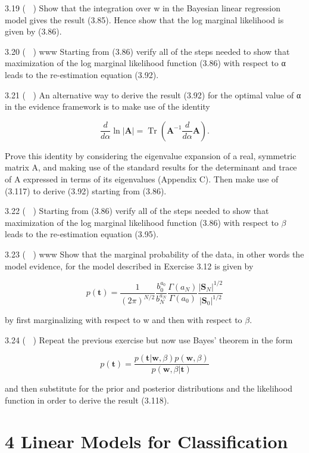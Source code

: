 \documentclass[
  10
]{article}
\begin{document}
3.19 ( ) Show that the integration over w in the Bayesian linear
regression model gives the result (3.85). Hence show that the log
marginal likelihood is given by (3.86).

3.20 ( ) www Starting from (3.86) verify all of the steps needed to show
that maximization of the log marginal likelihood function (3.86) with
respect to α leads to the re-estimation equation (3.92).

3.21 ( ) An alternative way to derive the result (3.92) for the optimal
value of α in the evidence framework is to make use of the identity

\[
\frac {d}{d \alpha} \ln | \mathbf {A} | = \operatorname{Tr} \left(\mathbf {A} ^ {- 1} \frac {d}{d \alpha} \mathbf {A}\right).\tag{3.117}
\]

Prove this identity by considering the eigenvalue expansion of a real,
symmetric matrix A, and making use of the standard results for the
determinant and trace of A expressed in terms of its eigenvalues
(Appendix C). Then make use of (3.117) to derive (3.92) starting from
(3.86).

3.22 ( ) Starting from (3.86) verify all of the steps needed to show
that maximization of the log marginal likelihood function (3.86) with
respect to \(\beta\) leads to the re-estimation equation (3.95).

3.23 ( ) www Show that the marginal probability of the data, in other
words the model evidence, for the model described in Exercise 3.12 is
given by

\[
p (\mathbf {t}) = \frac {1}{(2 \pi) ^ {N / 2}} \frac {b _ {0} ^ {a _ {0}}}{b _ {N} ^ {a _ {N}}} \frac {\Gamma (a _ {N})}{\Gamma (a _ {0})} \frac {| \mathbf {S} _ {N} | ^ {1 / 2}}{| \mathbf {S} _ {0} | ^ {1 / 2}}\tag{3.118}
\]

by first marginalizing with respect to w and then with respect to
\(\beta .\)

3.24 ( ) Repeat the previous exercise but now use Bayes' theorem in the
form

\[
p (\mathbf {t}) = \frac {p (\mathbf {t} | \mathbf {w} , \beta) p (\mathbf {w} , \beta)}{p (\mathbf {w} , \beta | \mathbf {t})}\tag{3.119}
\]

and then substitute for the prior and posterior distributions and the
likelihood function in order to derive the result (3.118).

\section{4 Linear Models for
Classification}\label{linear-models-for-classification}
\end{document}
